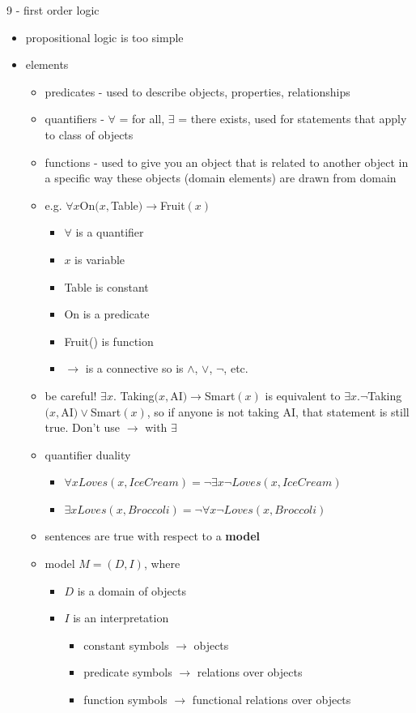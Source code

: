 \documentclass[11pt]{article}
\newcommand{\ee}[1]{\ensuremath{#1}}
\begin{document}
\begin{description}
\item 9 - first order logic
\begin{itemize}
	\item propositional logic is too simple
	\item elements
	\begin{itemize}
		\item predicates - used to describe objects, properties, relationships
		\item quantifiers - \ee{\forall} = for all, \ee{\exists} = there exists, used for statements that apply to class of objects
		\item functions - used to give you an object that is related to another object in a specific way
		\subitem these objects (domain elements) are drawn from domain
		\item e.g. \ee{\forall x}On\ee{(x,}Table\ee{) \rightarrow}Fruit\ee{(x)}
		\begin{itemize}
			\item \ee{\forall} is a quantifier
			\item \ee{x} is variable
			\item Table is constant
			\item On is a predicate
			\item Fruit() is function
			\item \ee{\rightarrow} is a connective
			\subitem so is \ee{\wedge}, \ee{\vee}, \ee{\lnot}, etc.
		\end{itemize}
		\item be careful! \ee{\exists x.} Taking\ee{(x,}AI\ee{)\rightarrow}Smart\ee{(x)} is equivalent to \ee{\exists x.\lnot}Taking\ee{(x,}AI\ee{)\vee}Smart\ee{(x)}, so if anyone is not taking AI, that statement is still true. Don't use \ee{\rightarrow} with \ee{\exists}
		\item quantifier duality
		\begin{itemize}
			\item \ee{\forall x Loves(x,IceCream) = \lnot \exists x \lnot Loves(x, IceCream)} 
			\item \ee{\exists x Loves(x, Broccoli) = \lnot \forall x \lnot Loves(x, Broccoli)}
		\end{itemize}
		
		\item sentences are true with respect to a \textbf{model}
		\item model \ee{M = (D,I)}, where 
		\begin{itemize}
			\item \ee{D} is a domain of objects
			\item \ee{I} is an interpretation
			\begin{itemize}
				\item constant symbols \ee{\rightarrow} objects
				\item predicate symbols \ee{\rightarrow} relations over objects
				\item function symbols \ee{\rightarrow} functional relations over objects
			\end{itemize}
		\end{itemize}
		

\end{itemize}
\end{itemize}
\end{description}
\end{document}
